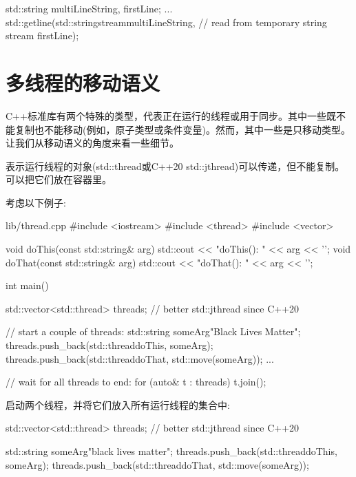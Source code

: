 \begin{codebox}[cpp]
std::string multiLineString, firstLine;
...
std::getline(std::stringstream{multiLineString}, // read from temporary string stream
firstLine);
\end{codebox}


\section{多线程的移动语义}

C++标准库有两个特殊的类型，代表正在运行的线程或用于同步。其中一些既不能复制也不能移动(例如，原子类型或条件变量)。然而，其中一些是只移动类型。让我们从移动语义的角度来看一些细节。\par


表示运行线程的对象(std::thread或C++20 std::\allowbreak{}jthread)可以传递，但不能复制。可以把它们放在容器里。\par

考虑以下例子:\par

\begin{codeboxt}[cpp]{lib/thread.cpp}
#include <iostream>
#include <thread>
#include <vector>

void doThis(const std::string& arg) {
  std::cout << "doThis(): " << arg << '\n';
}
void doThat(const std::string& arg) {
  std::cout << "doThat(): " << arg << '\n';
}

int main()
{
  std::vector<std::thread> threads; // better std::jthread since C++20

  // start a couple of threads:
  std::string someArg{"Black Lives Matter"};
  threads.push_back(std::thread{doThis, someArg});
  threads.push_back(std::thread{doThat, std::move(someArg)});
  ...

  // wait for all threads to end:
  for (auto& t : threads) {
    t.join();
  }
}
\end{codeboxt}

启动两个线程，并将它们放入所有运行线程的集合中:\par

\begin{codebox}[cpp]
std::vector<std::thread> threads; // better std::jthread since C++20

std::string someArg{"black lives matter"};
threads.push_back(std::thread{doThis, someArg});
threads.push_back(std::thread{doThat, std::move(someArg)});
\end{codebox}


